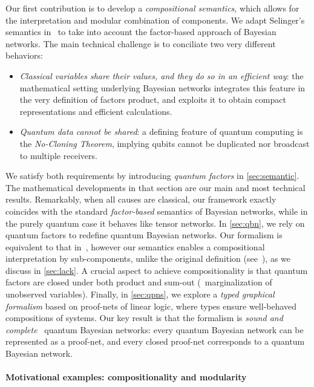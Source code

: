 Our first contribution is to develop a \emph{compositional semantics}, which allows for the interpretation and modular combination of components.
We adapt Selinger's semantics in~\cite{Selinger2004} to take into account the factor-based approach of Bayesian networks.
The main technical challenge is to conciliate two very different behaviors:
\begin{itemize}
\item
\emph{Classical variables share their values, and they do so in an efficient way}: the mathematical setting underlying Bayesian networks integrates this feature in the very definition of factors product, and exploits it to obtain compact representations and efficient calculations.
\item
\emph{Quantum data cannot be shared}: a defining feature of quantum computing is the \emph{No-Cloning Theorem}, implying qubits cannot be duplicated nor broadcast to multiple receivers.
\end{itemize}

We satisfy both requirements by introducing \emph{quantum factors} in \cref{sec:semantic}.
The mathematical developments in that section are our main and most technical results. 
Remarkably, when all causes are classical, our framework exactly coincides with the standard \emph{factor-based} semantics of Bayesian networks, while in the purely quantum case it behaves like tensor networks.
In \cref{sec:qbn}, we rely on quantum factors to redefine quantum Bayesian networks.
Our formalism is equivalent to that in~\cite{GBN2014}, however our semantics enables a compositional interpretation by sub-components, unlike the original definition (see~\cite[page 12]{GBN2014}), as we discuss in \cref{sec:lack}.
A crucial aspect to achieve compositionality is that quantum factors are closed under both product and sum-out (\ie\ marginalization of unobserved variables).
Finally, in \cref{sec:qpns}, we explore a \emph{typed graphical formalism} based on proof-nets of linear logic, where types ensure well-behaved compositions of systems.
Our key result is that the formalism is \emph{sound and complete} \wrt\ quantum Bayesian networks: every quantum Bayesian network can be represented as a proof-net, and every closed proof-net corresponds to a quantum Bayesian network.

\paragraph*{Motivational examples: compositionality and modularity}
\label{sec:motivational}

